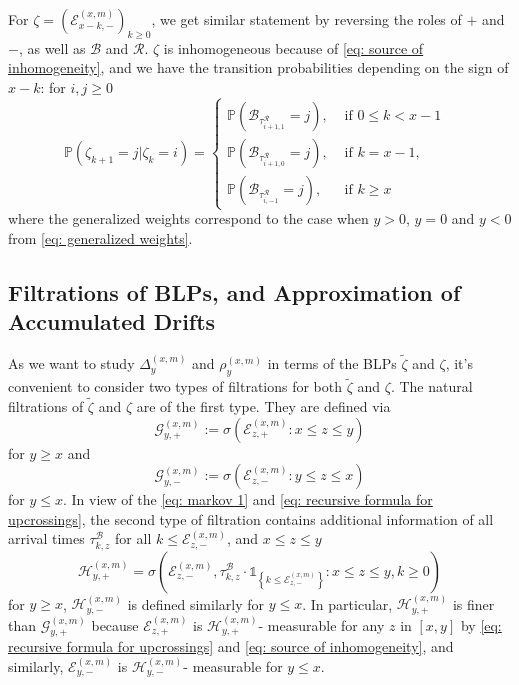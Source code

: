\documentclass[twoside,12pt, a4paper]{article}
\numberwithin{equation}{section}
\theoremstyle{remark}
\begin{document}
	For $\zeta= \left(\mathcal{E}^{(x,m)}_{x-k,-} \right)_{k\geq 0}$, we get similar statement by reversing the roles of $+$ and $-$, as well as $\mathcal{B}$ and $\mathcal{R}$. $\zeta$ is inhomogeneous because of \eqref{eq: source of inhomogeneity}, and we have the transition probabilities depending on the sign of $x-k$: for $i,j\geq 0$
	\begin{equation}\label{eq: transition prob on negative}
		\mathbb{P}\left(\zeta_{k+1}=j \vert \zeta_k =i  \right) = 
		\begin{cases}
			\mathbb{P}\left( \mathcal{B}_{\tau_{i+1,1}^{\mathcal{R}}} = j \right) ,& \mbox{ if $0 \leq k <  x-1$ }
			\\
			\mathbb{P}\left( \mathcal{B}_{\tau_{i+1,0}^{\mathcal{R}}} = j \right) ,& \mbox{ if $k =  x-1$, }
			\\
			\mathbb{P}\left( \mathcal{B}_{\tau_{i,-1}^{\mathcal{R}}} = j \right) ,& \mbox{ if $k \geq x$ }
		\end{cases}
	\end{equation}
	where the generalized weights correspond to the case when $y>0$, $y=0$ and $y<0$ from \eqref{eq: generalized weights}.
	
	\subsection{Filtrations of BLPs, and Approximation of Accumulated Drifts}\label{subsec: measurability}
	
	As we want to study $\Delta^{(x,m)}_{y}$ and $\rho^{(x,m)}_{y}$ in terms of the BLPs $\tilde{\zeta}$ and $\zeta$, it's convenient to consider two types of filtrations for both $\tilde{\zeta}$ and $\zeta$. The natural filtrations of $\tilde{\zeta}$ and $\zeta$ are of the first type. They are defined via 
	$$\mathcal{G}_{y, +}^{(x,m)}:=\sigma\left(\mathcal{E}^{(x,m)}_{z, +}: x \le z \le y\right) $$ for $y \ge x$ and $$\mathcal{G}_{y, -}^{(x,m)}:=\sigma\left(\mathcal{E}^{(x,m)}_{z, -}: y \le z \le x\right) $$ for $y \le x$.
	In view of the \eqref{eq: markov 1} and \eqref{eq: recursive formula for upcrossings},
	the second type of filtration contains additional information of all arrival times $\tau^\mathcal{B}_{k,z}$ for all $k\leq \mathcal{E}^{(x,m)}_{z, -}$, and $x\leq z \leq y$
	\[
	\mathcal{H}_{y, +}^{(x,m)} = \sigma\left( \mathcal{E}_{z, -}^{(x,m)}, \tau_{k, z}^\mathcal{B}\cdot \mathbb{1}_{\left\{ k\leq \mathcal{E}_{z, -}^{(x,m)} \right\}} : x \leq  z \leq y,  k \geq 0 \right) 
	\]
	for $y\geq x$, $\mathcal{H}_{y, -}^{(x,m)}$ is defined similarly for $y\leq x$.
	In particular, $\mathcal{H}_{y, +}^{(x,m)}$ is finer than $\mathcal{G}_{y, +}^{(x,m)}$ because $\mathcal{E}_{z, +}^{(x,m)}$ is $\mathcal{H}_{y, +}^{(x,m)}$- measurable for any $z$ in $[x,y]$ by \eqref{eq: recursive formula for upcrossings} and \eqref{eq: source of inhomogeneity}, and similarly, $\mathcal{E}_{y, -}^{(x,m)}$ is $\mathcal{H}_{y, -}^{(x,m)}$- measurable for $ y\leq x$. 
	
\end{document}
